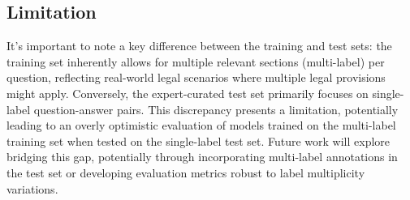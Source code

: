 \subsection{Limitation}
It's important to note a key difference between the training and test sets: the training set inherently allows for multiple relevant sections (multi-label) per question, reflecting real-world legal scenarios where multiple legal provisions might apply. Conversely, the expert-curated test set primarily focuses on single-label question-answer pairs. This discrepancy presents a limitation, potentially leading to an overly optimistic evaluation of models trained on the multi-label training set when tested on the single-label test set. Future work will explore bridging this gap, potentially through incorporating multi-label annotations in the test set or developing evaluation metrics robust to label multiplicity variations.

